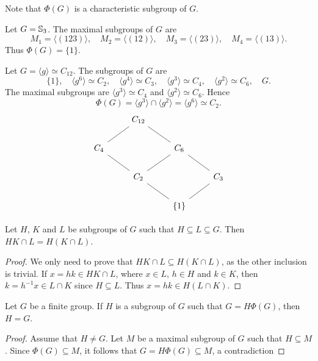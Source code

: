 Note that $\Phi(G)$ is a characteristic subgroup of $G$.


\begin{example}
	Let $G=\mathbb{S}_3$. The maximal subgroups of $G$ are 
	\[
	M_1=\langle (123)\rangle,
	\quad
	M_2=\langle (12)\rangle,
	\quad
	M_3=\langle (23)\rangle,
	\quad
	M_4=\langle (13)\rangle.
	\]
	Thus 
	$\Phi(G)=\{1\}$. 
\end{example}

\begin{example}
	Let $G=\langle g\rangle\simeq C_{12}$. The subgroups of $G$ are  
	\[
	\{1\},\quad
	\langle g^6\rangle\simeq C_2,\quad
	\langle g^4\rangle\simeq C_3,\quad
	\langle g^3\rangle\simeq C_4,\quad
	\langle g^2\rangle\simeq C_6,\quad
	G.
	\]
	The maximal subgroups are $\langle g^3\rangle\simeq C_4$ and $\langle
	g^2\rangle\simeq C_6$. Hence \[
	\Phi(G)=\langle g^3\rangle\cap \langle
	g^2\rangle=\langle g^6\rangle\simeq C_2.
	\] 
\[\begin{tikzcd}
	& {C_{12}} \\
	{C_4} && {C_6} \\
	& {C_2} && {C_3} \\
	&& {\{1\}}
	\arrow[no head, from=4-3, to=3-2]
	\arrow[no head, from=4-3, to=3-4]
	\arrow[no head, from=3-4, to=2-3]
	\arrow[no head, from=2-3, to=1-2]
	\arrow[no head, from=3-2, to=2-1]
	\arrow[no head, from=2-1, to=1-2]
	\arrow[no head, from=3-2, to=2-3]
\end{tikzcd}\]
\end{example}


\begin{lemma}[Dedekind]
	\label{lem:Dedekind}
	Let $H$, $K$ and $L$ be subgroups of $G$ such that $H\subseteq L\subseteq G$. Then
	$HK\cap L=H(K\cap L)$.
\end{lemma}

\begin{proof}
	We only need to prove that $HK\cap L\subseteq H(K\cap L)$, 
	as the other inclusion is trivial. If 
	$x=hk\in HK\cap L$, where $x\in L$, $h\in H$ and $k\in K$,
	then $k=h^{-1}x\in L\cap K$ since $H\subseteq L$. Thus $x=hk\in H(L\cap
	K)$.
\end{proof}

\begin{lemma}
	\label{lem:G=HPhi(G)}
	Let $G$ be a finite group. If $H$ is a subgroup of $G$ such that $G=H\Phi(G)$,
	then $H=G$.
\end{lemma}

\begin{proof}
	Assume that $H\ne G$. Let $M$ be a maximal subgroup of $G$ such that
	$H\subseteq M$. Since $\Phi(G)\subseteq M$, it follows that $G=H\Phi(G)\subseteq M$, a contradiction
\end{proof}


